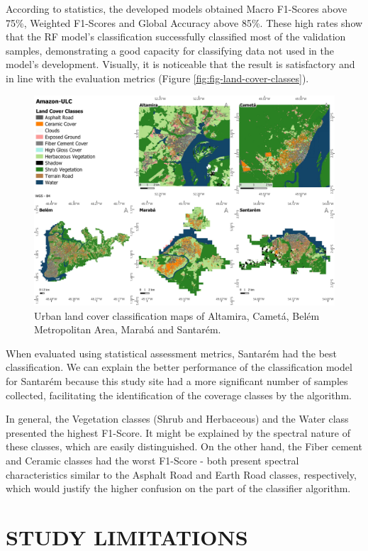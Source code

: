 \documentclass[preprint, 3p,
authoryear]{elsarticle} %
\begin{document}
According to statistics, the developed models obtained Macro F1-Scores
above 75\%, Weighted F1-Scores and Global Accuracy above 85\%. These
high rates show that the RF model's classification successfully
classified most of the validation samples, demonstrating a good capacity
for classifying data not used in the model's development. Visually, it
is noticeable that the result is satisfactory and in line with the
evaluation metrics (Figure \ref{fig:fig-land-cover-classes}).

\begin{figure}
\includegraphics[width=.8\linewidth]{images/ULC_Legend_v2-tile} \caption{\label{fig:fig-land-cover-classes}Urban land cover classification maps of Altamira, Cametá, Belém Metropolitan Area, Marabá and Santarém.}\label{fig:fig-2}
\end{figure}

When evaluated using statistical assessment metrics, Santarém had the
best classification. We can explain the better performance of the
classification model for Santarém because this study site had a more
significant number of samples collected, facilitating the identification
of the coverage classes by the algorithm.

In general, the Vegetation classes (Shrub and Herbaceous) and the Water
class presented the highest F1-Score. It might be explained by the
spectral nature of these classes, which are easily distinguished. On the
other hand, the Fiber cement and Ceramic classes had the worst F1-Score
- both present spectral characteristics similar to the Asphalt Road and
Earth Road classes, respectively, which would justify the higher
confusion on the part of the classifier algorithm.

\hypertarget{study-limitations}{%
\section{STUDY LIMITATIONS}\label{study-limitations}}
\end{document}
